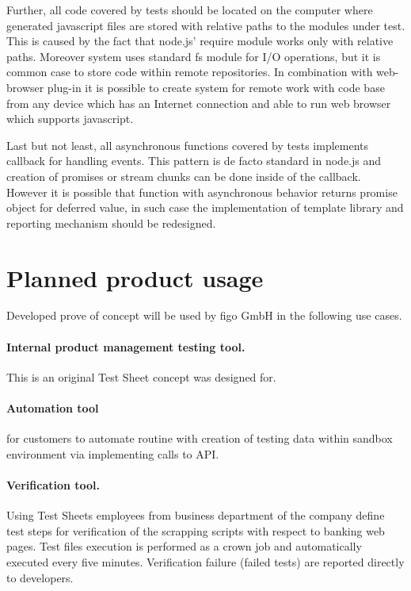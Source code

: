 Further, all code covered by tests should be located on the computer where generated javascript files are stored with relative paths to the modules under test. This is caused by the fact that node.js' require module works only with relative paths. Moreover system uses standard fs module for I/O operations, but it is common case to store code within remote repositories. In combination with web-browser plug-in it is possible to create system for remote work with code base from any device which has an Internet connection and able to run web browser which supports javascript.

Last but not least, all asynchronous functions covered by tests implements callback for handling events. This pattern is de facto standard in node.js and creation of promises or stream chunks can be done inside of the callback. However it is possible that function with asynchronous behavior returns promise object for deferred value, in such case the implementation of template library and reporting mechanism should be redesigned.

\section{Planned product usage}
Developed prove of concept will be used by figo GmbH in the following use cases.

\paragraph{Internal product management testing tool.} This is an original Test Sheet concept was designed for.
\paragraph{Automation tool} for customers to automate routine with creation of testing data within sandbox environment via implementing calls to API.
\paragraph{Verification tool.} Using Test Sheets employees from business department of the company define test steps for verification of the scrapping scripts with respect to banking web pages. Test files execution is performed as a crown job and automatically executed every five minutes. Verification failure (failed tests) are reported directly to developers.


